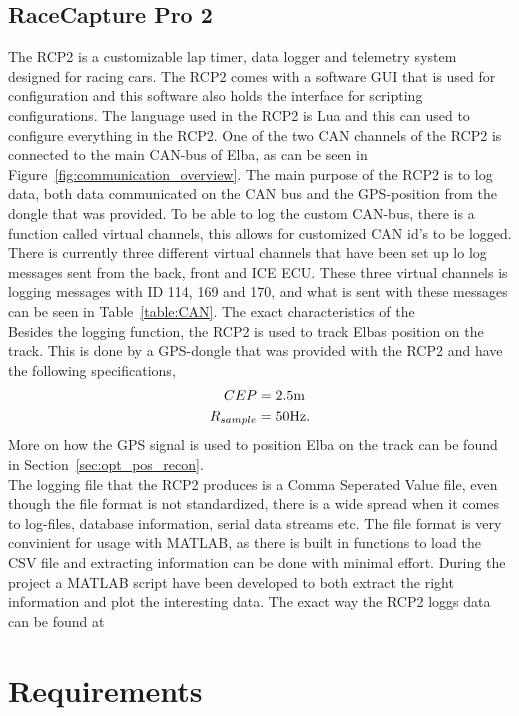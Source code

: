 \subsection{RaceCapture Pro 2}
The RCP2 is a customizable lap timer, data logger and telemetry system designed
for racing cars. The RCP2 comes with a software GUI that is used for
configuration and this software also holds the interface for scripting
configurations.  The language used in the RCP2 is Lua and this can used to
configure everything in the RCP2. One of the two CAN channels of the RCP2 is
connected to the main CAN-bus of Elba, as can be seen in
Figure~\ref{fig:communication_overview}.  The main purpose of the RCP2 is to log
data, both data communicated on the CAN bus and the GPS-position from the dongle that
was provided. To be able to log the custom CAN-bus, there is a function called
virtual channels, this allows for customized CAN id's to be logged. There is
currently three different virtual channels that have been set up lo log messages
sent from the back, front and ICE ECU\@. These three virtual channels is logging
messages with ID 114, 169 and 170, and what is sent with these messages can be
seen in Table~\ref{table:CAN}. The exact characteristics of the \\
Besides the logging function, the RCP2 is used to track Elbas position on the
track. This is done by a GPS-dongle that was provided with the RCP2 and have the
following specifications,
\begin{align}
   CEP&=2.5\textnormal{m}\\
   R_{sample}&=50\textnormal{Hz}.
\end{align}
More on how the GPS signal is used to position Elba on the track can be found in
Section~\ref{sec:opt_pos_recon}.\\
The logging file that the RCP2 produces is a Comma Seperated Value file, even
though the file format is not standardized, there is a wide spread when it
comes to log-files, database information, serial data streams etc.
The file format is very convinient for usage with MATLAB, as there is built in
functions to load the CSV file and extracting information can be done with
minimal effort. During the project a MATLAB script have been developed to both
extract the right information and plot the interesting data. The exact way the
RCP2 loggs data can be found at~\cite{RCP2_log} 


\section{Requirements}
